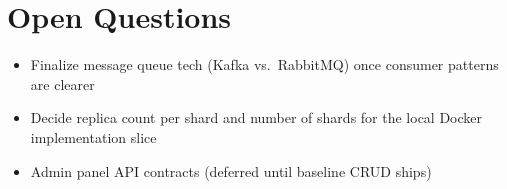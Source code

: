 \documentclass[11pt]{article}
\begin{document}
\section{Open Questions}

\begin{itemize}[nosep]
    \item[$\square$] Finalize message queue tech (Kafka vs.\ RabbitMQ) once consumer patterns are clearer
    \item[$\square$] Decide replica count per shard and number of shards for the local Docker implementation slice
    \item[$\square$] Admin panel API contracts (deferred until baseline CRUD ships)
\end{itemize}
\end{document}
